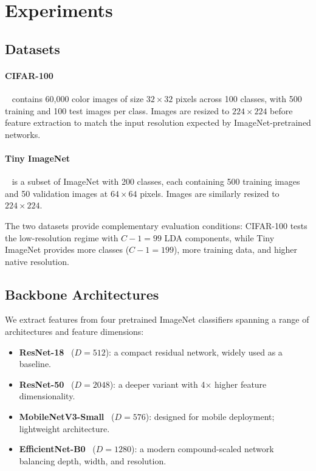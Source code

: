 \section{Experiments}
\label{sec:experiments}

\subsection{Datasets}

\paragraph{CIFAR-100}~\cite{krizhevsky2009learning} contains 60,000 color images of size $32 \times 32$ pixels across 100 classes, with 500 training and 100 test images per class. Images are resized to $224 \times 224$ before feature extraction to match the input resolution expected by ImageNet-pretrained networks.

\paragraph{Tiny ImageNet}~\cite{le2015tiny} is a subset of ImageNet with 200 classes, each containing 500 training images and 50 validation images at $64 \times 64$ pixels. Images are similarly resized to $224 \times 224$.

The two datasets provide complementary evaluation conditions: CIFAR-100 tests the low-resolution regime with $C - 1 = 99$ LDA components, while Tiny ImageNet provides more classes ($C - 1 = 199$), more training data, and higher native resolution.

\subsection{Backbone Architectures}

We extract features from four pretrained ImageNet classifiers spanning a range of architectures and feature dimensions:

\begin{itemize}[leftmargin=*]
    \item \textbf{ResNet-18}~\cite{he2016resnet} ($D = 512$): a compact residual network, widely used as a baseline.
    \item \textbf{ResNet-50}~\cite{he2016resnet} ($D = 2048$): a deeper variant with 4$\times$ higher feature dimensionality.
    \item \textbf{MobileNetV3-Small}~\cite{howard2019mobilenetv3} ($D = 576$): designed for mobile deployment; lightweight architecture.
    \item \textbf{EfficientNet-B0}~\cite{tan2019efficientnet} ($D = 1280$): a modern compound-scaled network balancing depth, width, and resolution.
\end{itemize}

